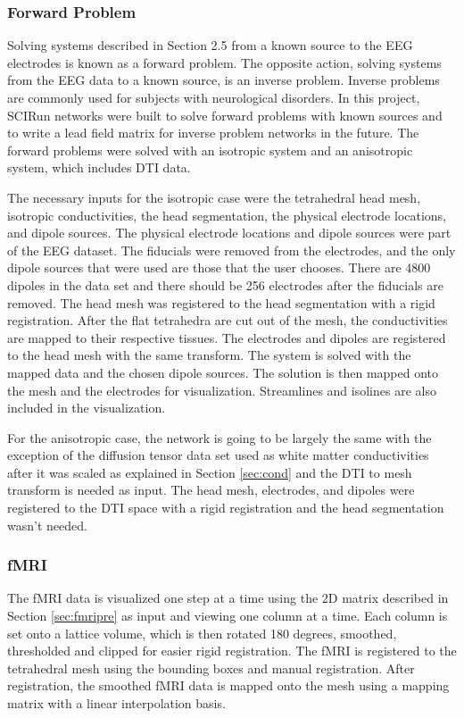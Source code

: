 \subsubsection{Forward Problem}

Solving systems described in Section 2.5 from a known source to the EEG electrodes is known as a forward problem. The opposite action, solving systems from the EEG data to a known source, is an inverse problem. Inverse problems are commonly used for subjects with neurological disorders. In this project, SCIRun networks were built to solve forward problems with known sources and to write a lead field matrix for inverse problem networks in the future. The forward problems were solved with an isotropic system and an anisotropic system, which includes DTI data. 

The necessary inputs for the isotropic case were the tetrahedral head mesh, isotropic conductivities, the head segmentation, the physical electrode locations, and dipole sources. The physical electrode locations and dipole sources were part of the EEG dataset. The fiducials were removed from the electrodes, and the only dipole sources that were used are those that the user chooses. There are 4800 dipoles in the data set and there should be 256 electrodes after the fiducials are removed. The head mesh was registered to the head segmentation with a rigid registration. After the flat tetrahedra are cut out of the mesh, the conductivities are mapped to their respective tissues. The electrodes and dipoles are registered to the head mesh with the same transform. The system is solved with the mapped data and the chosen dipole sources. The solution is then mapped onto the mesh and the electrodes for visualization. Streamlines and isolines are also included in the visualization.

For the anisotropic case, the network is going to be largely the same with the exception of the diffusion tensor data set used as white matter conductivities after it was scaled as explained in Section \ref{sec:cond} and the DTI to mesh transform is needed as input. The head mesh, electrodes, and dipoles were registered to the DTI space with a rigid registration and the head segmentation wasn't needed.

\subsubsection{fMRI}

The fMRI data is visualized one step at a time using the 2D matrix described in Section \ref{sec:fmripre} as input and viewing one column at a time. Each column is set onto a lattice volume, which is then rotated 180 degrees, smoothed, thresholded and clipped for easier rigid registration. The fMRI is registered to the tetrahedral mesh using the bounding boxes and manual registration. After registration, the smoothed fMRI data is mapped onto the mesh using a mapping matrix with a linear interpolation basis. 

